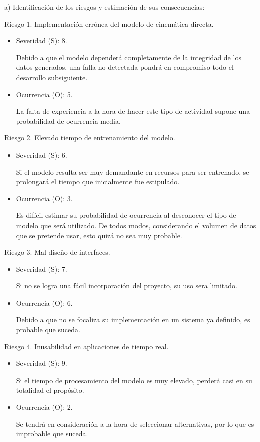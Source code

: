 \documentclass[
11pt, %
]{charter}
\begin{document}
a) Identificación de los riesgos y estimación de sus consecuencias:
 
Riesgo 1. Implementación errónea del modelo de cinemática directa. 
\begin{itemize}
	\item Severidad (S): 8.
	
	Debido a que el modelo dependerá completamente de la integridad de los datos generados, una falla no detectada pondrá en compromiso todo el desarrollo subsiguiente.
	\item Ocurrencia (O): 5.
	
	La falta de experiencia a la hora de hacer este tipo de actividad supone una probabilidad de ocurrencia media.
\end{itemize}   

Riesgo 2. Elevado tiempo de entrenamiento del modelo.
\begin{itemize}
	\item Severidad (S): 6.
	
	Si el modelo resulta ser muy demandante en recursos para ser entrenado, se prolongará el tiempo que inicialmente fue estipulado.
	\item Ocurrencia (O): 3.
	
	Es difícil estimar su probabilidad de ocurrencia al desconocer el tipo de modelo que será utilizado. De todos modos, considerando el volumen de datos que se pretende usar, esto quizá no sea muy probable.
\end{itemize}

Riesgo 3. Mal diseño de interfaces.
\begin{itemize}
	\item Severidad (S): 7.
	
	 Si no se logra una fácil incorporación del proyecto, su uso sera limitado.
	\item Ocurrencia (O): 6.
	
	Debido a que no se focaliza su implementación en un sistema ya definido, es probable que suceda.
\end{itemize}

Riesgo 4. Inusabilidad en aplicaciones de tiempo real.
\begin{itemize}
	\item Severidad (S): 9.
	
	Si el tiempo de procesamiento del modelo es muy elevado, perderá casi en su totalidad el propósito.
	\item Ocurrencia (O): 2.
	
	Se tendrá en consideración a la hora de seleccionar alternativas, por lo que es improbable que suceda.
\end{itemize}
\end{document}
